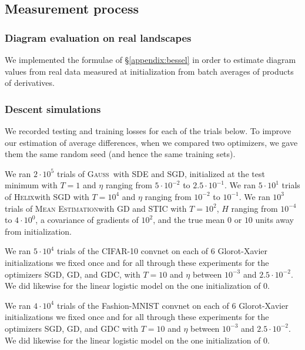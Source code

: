 \documentclass[anon,12pt]{colt2021} %
\newcommand{\Gauss}{\textsc{Gauss}}
\newcommand{\Helix}{\textsc{Helix}}
\newcommand{\MeanEstimation}{\textsc{Mean Estimation}}
\begin{document}
    \subsection{Measurement process}                                \label{appendix:measure}

        \subsubsection{Diagram evaluation on real landscapes}
            We implemented the formulae of \S\ref{appendix:bessel} in order
            to estimate diagram values from real data measured at
            initialization from batch averages of products of derivatives.

        \subsubsection{Descent simulations}
            We recorded testing and training losses for each of the trials below.  To
            improve our estimation of average differences, when we compared two
            optimizers, we gave them the same random seed (and hence the same
            training sets).

            We ran $2 \cdot 10^5$ trials of \Gauss\, with SDE and SGD,
            initialized at the test minimum with $T=1$ and $\eta$ ranging from
            $5\cdot 10^{-2}$ to $2.5\cdot 10^{-1}$.
            We ran $5 \cdot 10^1$ trials of \Helix with SGD with $T=10^4$
            and $\eta$ ranging from $10^{-2}$ to $10^{-1}$.
            We ran $10^3$ trials of \MeanEstimation with GD and STIC
            with $T=10^2$, $H$ ranging from $10^{-4}$ to $4 \cdot 10^0$,
            a covariance of gradients of $10^2$, and the true mean $0$ or
            $10$ units away from initialization.

            We ran $5 \cdot 10^4$ trials of the CIFAR-10 convnet on each of $6$
            Glorot-Xavier initializations we fixed once and for all through
            these experiments for the optimizers SGD, GD, and GDC, with $T=10$
            and $\eta$ between $10^{-3}$ and $2.5 \cdot 10^{-2}$.  We did
            likewise for the linear logistic model on the one initialization of
            $0$.

            We ran $4 \cdot 10^4$ trials of the Fashion-MNIST convnet on each
            of $6$ Glorot-Xavier initializations we fixed once and for all
            through these experiments for the optimizers SGD, GD, and GDC with
            $T=10$ and $\eta$ between $10^{-3}$ and $2.5 \cdot 10^{-2}$.  We
            did likewise for the linear logistic model on the one
            initialization of $0$. 
\end{document}
